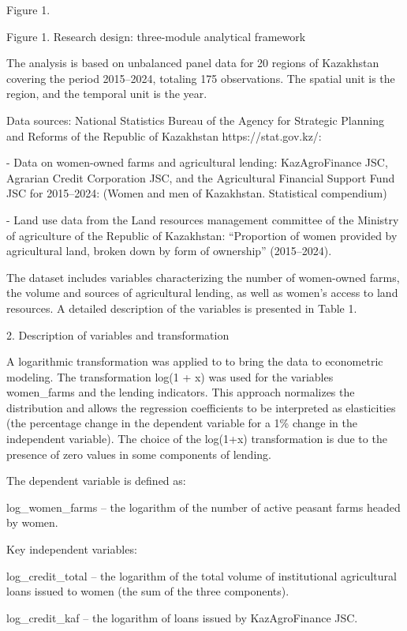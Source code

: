 Figure 1.

Figure 1. Research design: three-module analytical framework

The analysis is based on unbalanced panel data for 20 regions of
Kazakhstan covering the period 2015--2024, totaling 175 observations.
The spatial unit is the region, and the temporal unit is the year.

Data sources: National Statistics Bureau of the Agency for Strategic
Planning and Reforms of the Republic of Kazakhstan https://stat.gov.kz/:

- Data on women-owned farms and agricultural lending: KazAgroFinance
JSC, Agrarian Credit Corporation JSC, and the Agricultural Financial
Support Fund JSC for 2015--2024: (Women and men of Kazakhstan.
Statistical compendium)

- Land use data from the Land resources management committee of the
Ministry of agriculture of the Republic of Kazakhstan: ``Proportion of
women provided by agricultural land, broken down by form of ownership''
(2015--2024).

The dataset includes variables characterizing the number of women-owned
farms, the volume and sources of agricultural lending, as well as
women's access to land resources. A detailed description of the
variables is presented in Table 1.

2. Description of variables and transformation

A logarithmic transformation was applied to to bring the data to
econometric modeling. The transformation log(1 + x) was used for the
variables women\_farms and the lending indicators. This approach
normalizes the distribution and allows the regression coefficients to be
interpreted as elasticities (the percentage change in the dependent
variable for a 1\% change in the independent variable). The choice of
the log(1+x) transformation is due to the presence of zero values in
some components of lending.

The dependent variable is defined as:

log\_women\_farms -- the logarithm of the number of active peasant farms
headed by women.

Key independent variables:

log\_credit\_total -- the logarithm of the total volume of institutional
agricultural loans issued to women (the sum of the three components).

log\_credit\_kaf -- the logarithm of loans issued by KazAgroFinance JSC.

